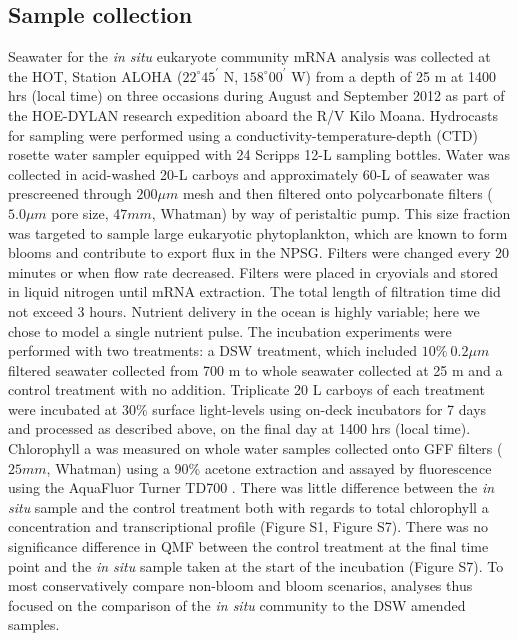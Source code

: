 \subsection{Sample collection}
Seawater for the \textit{in situ} eukaryote community mRNA analysis was collected at the HOT, Station ALOHA ($22^\circ 45^\prime$ N, $158^\circ 00^\prime$ W) from a depth of 25 m at 1400 hrs (local time) on three occasions during August and September 2012 as part of the HOE-DYLAN research expedition aboard the R/V Kilo Moana. Hydrocasts for sampling were performed using a conductivity-temperature-depth (CTD) rosette water sampler equipped with 24 Scripps 12-L sampling bottles. Water was collected in acid-washed 20-L carboys and approximately 60-L of seawater was prescreened through $200 \mu m$ mesh and then filtered onto polycarbonate filters ($5.0 \mu m$ pore size, $47 mm$, Whatman) by way of peristaltic pump. This size fraction was targeted to sample large eukaryotic phytoplankton, which are known to form blooms and contribute to export flux in the NPSG. Filters were changed every 20 minutes or when flow rate decreased. Filters were placed in cryovials and stored in liquid nitrogen until mRNA extraction. The total length of filtration time did not exceed 3 hours. Nutrient delivery in the ocean is highly variable; here we chose to model a single nutrient pulse. The incubation experiments were performed with two treatments: a DSW treatment, which included $10\% \ 0.2\mu m$ filtered seawater collected from 700 m to whole seawater collected at 25 m and a control treatment with no addition. Triplicate 20 L carboys of each treatment were incubated at 30\% surface light-levels using on-deck incubators for 7 days and processed as described above, on the final day at 1400 hrs (local time). Chlorophyll a was measured on whole water samples collected onto GF\/F filters ($25 mm$, Whatman) using a 90\% acetone extraction and assayed by fluorescence using the AquaFluor Turner TD700 \citep{Parsons1984}. There was little difference between the \textit{in situ} sample and the control treatment both with regards to total chlorophyll a concentration and transcriptional profile (Figure S1, Figure S7).  There was no significance difference in QMF between the control treatment at the final time point and the \textit{in situ} sample taken at the start of the incubation (Figure S7). To most conservatively compare non-bloom and bloom scenarios, analyses thus focused on the comparison of the \textit{in situ} community to the DSW amended samples. \par
